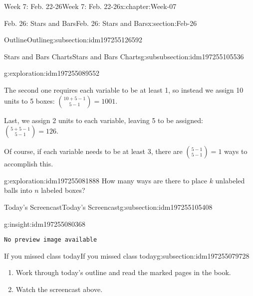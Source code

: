 \documentclass[oneside,10pt,]{book}
\newcommand{\mono}[1]{\texttt{#1}}
\numberwithin{equation}{section}
\newlength{\qrsize}
\newlength{\previewwidth}
\begin{document}
\begin{chapterptx}{Week 7: Feb. 22-26}{}{Week 7: Feb. 22-26}{}{}{x:chapter:Week-07}
\begin{sectionptx}{Feb. 26: Stars and Bars}{}{Feb. 26: Stars and Bars}{}{}{x:section:Feb-26}
\begin{subsectionptx}{Outline}{}{Outline}{}{}{g:subsection:idm197255126592}
\begin{subsubsectionptx}{Stars and Bars Charts}{}{Stars and Bars Charts}{}{}{g:subsubsection:idm197255105536}
\begin{exploration}{}{g:exploration:idm197255089552}
\par
The second one requires each variable to be at least 1, so instead we assign 10 units to 5 boxes: \(\binom{10+5-1}{5-1} = 1001\).%
\par
Last, we assign 2 units to each variable, leaving 5 to be assigned: \(\binom{5+5-1}{5-1} = 126\).%
\par
Of course, if each variable needs to be at least 3, there are \(\binom{5-1}{5-1} = 1\) ways to accomplish this.%
\end{exploration}%
\begin{exploration}{}{g:exploration:idm197255081888}%
How many ways are there to place \(k\) unlabeled balls into \(n\) labeled boxes?%
\end{exploration}%
\end{subsubsectionptx}
\end{subsectionptx}
%
%
\typeout{************************************************}
\typeout{************************************************}
%
\begin{subsectionptx}{Today's Screencast}{}{Today's Screencast}{}{}{g:subsection:idm197255105408}
\begin{insight}{}{g:insight:idm197255080368}%
\setlength{\qrsize}{9em}
\setlength{\previewwidth}{\linewidth}
\addtolength{\previewwidth}{-\qrsize}
\begin{tcbraster}[raster columns=2, raster column skip=1pt, raster halign=center, raster force size=false, raster left skip=0pt, raster right skip=0pt]%
\begin{tcolorbox}[previewstyle, width=\previewwidth]%
\mono{No preview image available}%
\end{tcolorbox}%
\begin{tcolorbox}[qrstyle]%
[QR LINK]\end{tcolorbox}%
\end{tcbraster}%
\end{insight}
\end{subsectionptx}
%
%
\typeout{************************************************}
\typeout{************************************************}
%
\begin{subsectionptx}{If you missed class today}{}{If you missed class today}{}{}{g:subsection:idm197255079728}
%
\begin{enumerate}
\item{}Work through today's outline and read the marked pages in the book.%
\item{}Watch the screencast above.%

\end{enumerate}
\end{subsectionptx}
\end{sectionptx}
\end{chapterptx}
\end{document}
